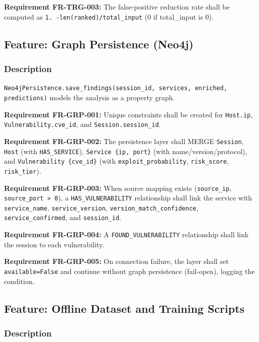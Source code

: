 \documentclass[10pt,journal,onecolumn]{IEEEtran}
\newcommand{\reqid}[1]{\textbf{#1}}
\begin{document}
\reqid{Requirement FR-TRG-003:} The false-positive reduction rate shall be computed as \texttt{1. -\allowbreak  len(ranked)/\allowbreak total\_\allowbreak input} (0 if total\_input is 0).

\subsection{Feature: Graph Persistence (Neo4j)}

\subsubsection{Description}

\texttt{Neo4jPersistence.\allowbreak save\_\allowbreak findings(session\_\allowbreak id, services, enriched, predictions)} models the analysis as a property graph.

\reqid{Requirement FR-GRP-001:} Unique constraints shall be created for \texttt{Host.ip}, \texttt{Vulnerability.cve\_id}, and \texttt{Session.session\_id}.

\reqid{Requirement FR-GRP-002:} The persistence layer shall MERGE \texttt{Session}, \texttt{Host} (with \texttt{HAS\_SERVICE}), \texttt{Service \{ip, port\}} (with name/version/protocol), and \texttt{Vulnerability \{cve\_\allowbreak id\}} (with \texttt{exploit\_probability}, \texttt{risk\_score}, \texttt{risk\_tier}).

\reqid{Requirement FR-GRP-003:} When source mapping exists (\texttt{source\_ip}, \texttt{source\_port > 0}), a \texttt{HAS\_VULNERABILITY} relationship shall link the service with \texttt{service\_name}, \texttt{service\_version}, \texttt{version\_\allowbreak match\_\allowbreak confidence}, \texttt{service\_confirmed}, and \texttt{session\_id}.

\reqid{Requirement FR-GRP-004:} A \texttt{FOUND\_VULNERABILITY} relationship shall link the session to each vulnerability.

\reqid{Requirement FR-GRP-005:} On connection failure, the layer shall set \texttt{available=False} and continue without graph persistence (fail-open), logging the condition.

\subsection{Feature: Offline Dataset and Training Scripts}

\subsubsection{Description}
\end{document}
